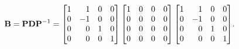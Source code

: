 \documentclass[11pt]{article}
\begin{document}
\begin{enumerate}
\begin{enumerate}
                    \[
                        \mat{B} = \mat{P} \mat{D} \mat{P}^{-1} =
                        \begin{bmatrix*}[r]
                            1 & 1  & 0 & 0 \\
                            0 & -1 & 0 & 0 \\
                            0 & 0  & 1 & 0 \\
                            0 & 0  & 0 & 1 \\
                        \end{bmatrix*}
                        \begin{bmatrix}
                            1 & 0 & 0 & 0 \\
                            0 & 0 & 0 & 0 \\
                            0 & 0 & 0 & 0 \\
                            0 & 0 & 0 & 0 \\
                        \end{bmatrix}
                        \begin{bmatrix*}[r]
                            1 & 1  & 0 & 0 \\
                            0 & -1 & 0 & 0 \\
                            0 & 0  & 1 & 0 \\
                            0 & 0  & 0 & 1 \\
                        \end{bmatrix*}
                        \! .
                    \]
          \end{enumerate}

          \pagebreak


\end{enumerate}
\end{document}
